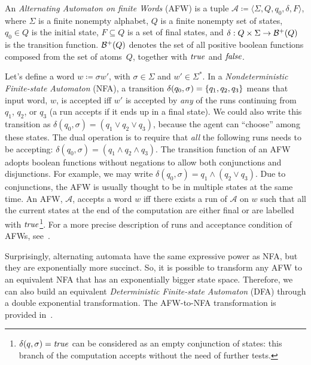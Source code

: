 \begin{definition}
	An \emph{Alternating Automaton on finite Words}
	(AFW) is a tuple
	$\mathcal{A} \coloneqq \langle \Sigma, Q, q_0, \delta, F \rangle$, where
	$\Sigma$ is a finite nonempty alphabet, $Q$ is a finite nonempty set of
	states, $q_0 \in Q$ is the initial state, $F \subseteq Q$ is a set of final
	states, and ${\delta: Q \times \Sigma \to \mathcal{B}^+(Q)}$ is the
	transition function.  $\mathcal{B}^+(Q)$ denotes the set of all positive
	boolean functions composed from the set of atoms~$Q$, together with $\text{\textit{true}}$
	and $\text{\textit{false}}$.
\end{definition}

Let's define a word $w \coloneqq \sigma w'$, with $\sigma \in \Sigma$ and $w'
\in \Sigma^*$.  In a \emph{Nondeterministic Finite-state Automaton}
(NFA), a transition
$\delta(q_0, \sigma) = \{q_1, q_2, q_3\}$ means that input word, $w$, is
accepted iff $w'$ is accepted by \emph{any} of the runs continuing from $q_1$,
$q_2$, or $q_3$ (a run accepts if it ends up in a final state).  We could also
write this transition as $\delta(q_0, \sigma) = (q_1 \lor q_2 \lor q_3)$,
because the agent can ``choose'' among these states. The dual operation is to
require that \emph{all} the following runs needs to be accepting: $\delta(q_0,
\sigma) = (q_1 \land q_2 \land q_3)$. The transition function of an AFW adopts
boolean functions without negations to allow both conjunctions and
disjunctions. For example, we may write $\delta(q_0, \sigma) = q_1 \land (q_2
\lor q_3)$. Due to conjunctions, the AFW is usually thought to be in multiple
states at the same time. An AFW, $\mathcal{A}$, accepts a word $w$ iff there
exists a run of $\mathcal{A}$ on $w$ such that all the current states at the
end of the computation are either final or are labelled with
$\text{\textit{true}}$\footnote{$\delta(q, \sigma) = \text{\textit{true}}$ can be considered as an empty
conjunction of states: this branch of the computation accepts without the need
of further tests.}. For a more precise description of runs and acceptance
condition of AFWs, see~\cite{bib:temp-logic-automata}.

Surprisingly, alternating automata have the same expressive power as NFA, but
they are exponentially more succinct. So, it is possible to transform any AFW
to an equivalent NFA that has an exponentially bigger state space. Therefore,
we can also build an equivalent \emph{Deterministic Finite-state Automaton}
(DFA) through a double
exponential transformation. The AFW-to-NFA transformation is provided
in~\cite{bib:temp-logic-automata}.



